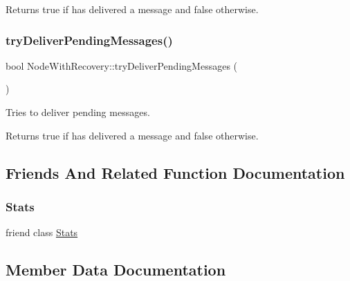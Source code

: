 \begin{DoxyReturn}{Returns}
true if has delivered a message and false otherwise. 
\end{DoxyReturn}
\mbox{\label{class_node_with_recovery_a462d825601a3c85ee4ef95be673790f8}} 
\subsubsection{\texorpdfstring{try\+Deliver\+Pending\+Messages()}{tryDeliverPendingMessages()}}
{\footnotesize\ttfamily bool Node\+With\+Recovery\+::try\+Deliver\+Pending\+Messages (\begin{DoxyParamCaption}{ }\end{DoxyParamCaption})\hspace{0.3cm}{\ttfamily [protected]}}



Tries to deliver pending messages. 

\begin{DoxyReturn}{Returns}
true if has delivered a message and false otherwise. 
\end{DoxyReturn}


\subsection{Friends And Related Function Documentation}
\mbox{\label{class_node_with_recovery_a129f65b6976377739eb6231b6962985e}} 
\subsubsection{\texorpdfstring{Stats}{Stats}}
{\footnotesize\ttfamily friend class \hyperlink{class_stats}{Stats}\hspace{0.3cm}{\ttfamily [friend]}}



\subsection{Member Data Documentation}
\mbox{\label{class_node_with_recovery_a2e574321bd92cb51ef3346168057fe0f}} 

